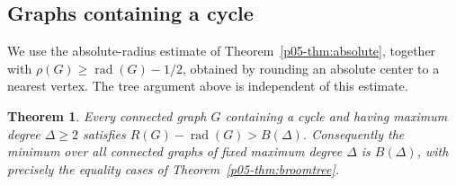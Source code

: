 \documentclass[11pt,a4paper]{article}
\newtheorem{theorem}{Theorem}[section]
\newcommand{\rad}{\operatorname{rad}}\newcommand{\diam}{\operatorname{diam}}
\begin{document}
\subsection{Graphs containing a cycle}\label{p05-sec:broomcyclic}
We use the absolute-radius estimate of Theorem~\ref{p05-thm:absolute},
together with $\rho(G)\ge\rad(G)-1/2$, obtained by rounding an absolute
center to a nearest vertex. The tree argument above is independent of
this estimate.

\begin{theorem}\label{p05-thm:broomglobal}
Every connected graph $G$ containing a cycle and having maximum degree
$\Delta\ge2$ satisfies $R(G)-\rad(G)>B(\Delta)$. Consequently the minimum over
all connected graphs of fixed maximum degree $\Delta$ is $B(\Delta)$, with precisely
the equality cases of Theorem~\ref{p05-thm:broomtree}.
\end{theorem}
\end{document}
